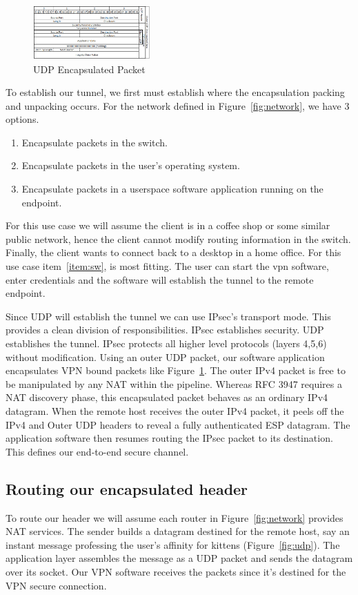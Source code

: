 \documentclass[conference,12pt]{IEEEtran}
\begin{document}
\begin{figure}
\centering
\includegraphics[width=0.4\textwidth]{UDP_encapsualted.PNG}
\caption{UDP Encapsulated Packet}
\label{fig:udp_encap}
\end{figure}

To establish our tunnel, we first must
establish where the encapsulation packing and unpacking occurs. For the
network defined in Figure~\ref{fig:network}, we have 3 options. 
\begin{enumerate}
\item Encapsulate packets in the switch.
\item Encapsulate packets in the user's operating system.
\item \label{item:sw} Encapsulate packets in a userspace software application running on the endpoint.
\end{enumerate}
For this use case we will assume the client is in a coffee shop or some similar
public network, hence the client cannot modify routing information in the switch.
Finally, the client wants to connect back to a desktop in a home office. For
this use case 
item~\ref{item:sw}, is most fitting. The user can start the vpn software, enter
credentials and the software will establish the tunnel to the remote endpoint.

Since UDP will establish the tunnel we can use IPsec's transport mode. This
provides a clean division of responsibilities.  IPsec establishes security. UDP
establishes the tunnel.  IPsec protects all higher level protocols
(layers 4,5,6) without modification. Using an outer UDP packet, our software
application encapsulates VPN bound packets like
Figure~\ref{fig:udp_encap}.  The outer IPv4 packet is free to be manipulated
by any NAT within the pipeline. Whereas RFC 3947 requires a NAT discovery phase,
this encapsulated packet behaves as an ordinary IPv4 datagram. When the remote
host receives the outer IPv4 packet, it peels off the IPv4 and Outer UDP headers
to reveal a fully authenticated ESP datagram. The
application software then resumes routing the IPsec packet to its destination.
This defines our end-to-end secure channel.

\subsection{Routing our encapsulated header}
To route our header we will assume each router in Figure~\ref{fig:network}
provides NAT services.  The sender builds a datagram destined for the remote
host, say an
instant message professing the user's affinity for kittens
(Figure~\ref{fig:udp}). The application layer assembles the message as a UDP
packet and sends the datagram over its socket. Our VPN software receives the packets
since it's destined for the VPN secure connection.  
\end{document}
